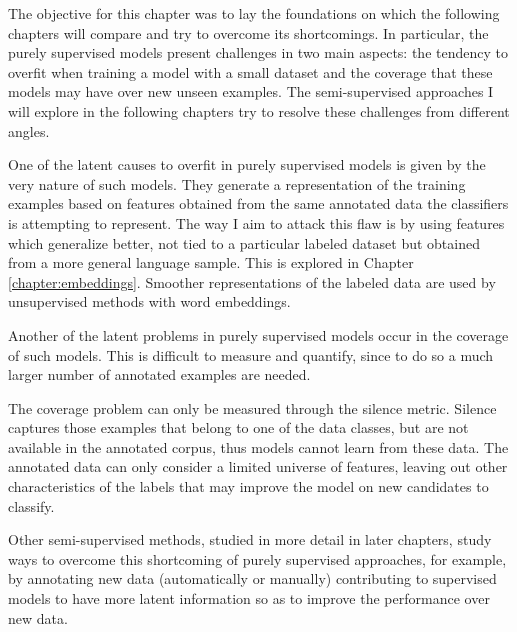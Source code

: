 The objective for this chapter was to lay the foundations on which the
following chapters will compare and try to overcome its shortcomings. In
particular, the purely supervised models present challenges in two main
aspects: the tendency to overfit when training a model with a small dataset and
the coverage that these models may have over new unseen examples. The
semi-supervised approaches I will explore in the following chapters try to
resolve these challenges from different angles.

One of the latent causes to overfit in purely supervised models is given by the
very nature of such models. They generate a representation of the training
examples based on features obtained from the same annotated data the
classifiers is attempting to represent. The way I aim to attack this flaw is
by using features which generalize better, not tied to a particular labeled
dataset but obtained from a more general language sample. This is explored in
Chapter \ref{chapter:embeddings}. Smoother representations of the labeled
data are used by unsupervised methods with word embeddings.

Another of the latent problems in purely supervised models occur in the
coverage of such models. This is difficult to measure and quantify, since to do
so a much larger number of annotated examples are needed.

The coverage problem can only be measured through the silence metric. Silence
captures those examples that belong to one of the data classes, but are not
available in the annotated corpus, thus models cannot learn from these data.
The annotated data can only consider a limited universe of features, leaving
out other characteristics of the labels that may improve the model on new
candidates to classify.

Other semi-supervised methods, studied in more detail in later chapters, study
ways to overcome this shortcoming of purely supervised approaches, for example, by
annotating new data (automatically or manually) contributing to supervised models
to have more latent information so as to improve the performance over new data.
